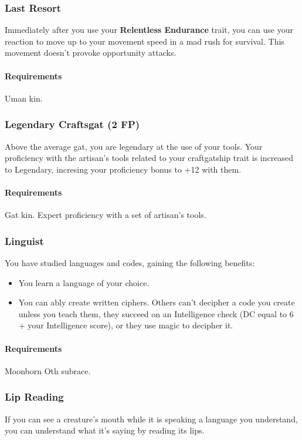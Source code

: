 \subsubsection{Last Resort} \label{feat::lastresort}
    Immediately after you use your \textbf{Relentless Endurance} trait, you can use your reaction to move up to your movement speed in a mad rush for survival.
    This movement doesn't provoke opportunity attacks.
    \paragraph{Requirements} Uman kin.
\subsubsection{Legendary Craftsgat (2 FP)} \label{feat::legendarycraftsgat}
    Above the average gat, you are legendary at the use of your tools.
    Your proficiency with the artisan's tools related to your craftgatship trait is increased to Legendary, incresing your proficiency bonus to +12 with them.
    \paragraph{Requirements} Gat kin. Expert proficiency with a set of artisan's tools.
\subsubsection{Linguist} \label{feat::linguist}
    You have studied languages and codes, gaining the following benefits:
    \begin{itemize}
        \item You learn a language of your choice.
        \item You can ably create written ciphers.
        Others can't decipher a code you create unless you teach them, they succeed on an Intelligence check (DC equal to 6 + your Intelligence score), or they use magic to decipher it. %
    \end{itemize}
    \paragraph{Requirements} Moonborn Oth subrace.
\subsubsection{Lip Reading} \label{feat::lipreading}
    If you can see a creature's mouth while it is speaking a language you understand, you can understand what it's saying by reading its lips.
